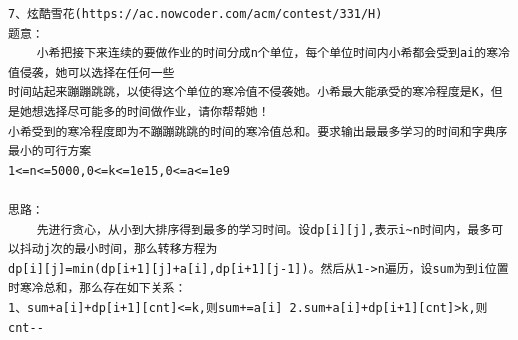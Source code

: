 \documentclass[twoside]{article}
\begin{document}
\begin{lstlisting}
7、炫酷雪花(https://ac.nowcoder.com/acm/contest/331/H)
题意：
    小希把接下来连续的要做作业的时间分成n个单位，每个单位时间内小希都会受到ai的寒冷值侵袭，她可以选择在任何一些
时间站起来蹦蹦跳跳，以使得这个单位的寒冷值不侵袭她。小希最大能承受的寒冷程度是K，但是她想选择尽可能多的时间做作业，请你帮帮她！
小希受到的寒冷程度即为不蹦蹦跳跳的时间的寒冷值总和。要求输出最最多学习的时间和字典序最小的可行方案
1<=n<=5000,0<=k<=1e15,0<=a<=1e9

思路：
    先进行贪心，从小到大排序得到最多的学习时间。设dp[i][j],表示i~n时间内，最多可以抖动j次的最小时间，那么转移方程为
dp[i][j]=min(dp[i+1][j]+a[i],dp[i+1][j-1])。然后从1->n遍历，设sum为到i位置时寒冷总和，那么存在如下关系：
1、sum+a[i]+dp[i+1][cnt]<=k,则sum+=a[i] 2.sum+a[i]+dp[i+1][cnt]>k,则cnt--





\end{lstlisting}
\end{document}
